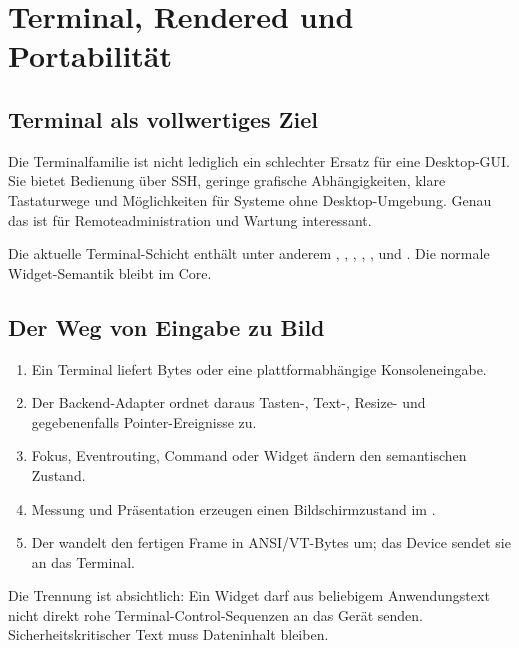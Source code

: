 \chapter{Terminal, Rendered und Portabilität}\label{chap:backends}

\section{Terminal als vollwertiges Ziel}
Die Terminalfamilie ist nicht lediglich ein
schlechter Ersatz für eine Desktop-GUI.
Sie bietet Bedienung über SSH, geringe
grafische Abhängigkeiten, klare Tastaturwege
und Möglichkeiten für Systeme ohne
Desktop-Umgebung. Genau das ist für
Remoteadministration und Wartung
interessant.

Die aktuelle Terminal-Schicht enthält
unter anderem ,
, ,
,
,
 und
.
Die normale Widget-Semantik bleibt im Core.

\section{Der Weg von Eingabe zu Bild}
\begin{enumerate}
\item Ein Terminal liefert Bytes oder eine
plattformabhängige Konsoleneingabe.
\item Der Backend-Adapter ordnet daraus
Tasten-, Text-, Resize- und gegebenenfalls
Pointer-Ereignisse zu.
\item Fokus, Eventrouting, Command oder Widget
ändern den semantischen Zustand.
\item Messung und Präsentation erzeugen
einen Bildschirmzustand im .
\item Der  wandelt
den fertigen Frame in ANSI/VT-Bytes um;
das Device sendet sie an das Terminal.
\end{enumerate}
Die Trennung ist absichtlich:
Ein Widget darf aus beliebigem Anwendungstext
nicht direkt rohe Terminal-Control-Sequenzen
an das Gerät senden. Sicherheitskritischer
Text muss Dateninhalt bleiben.

